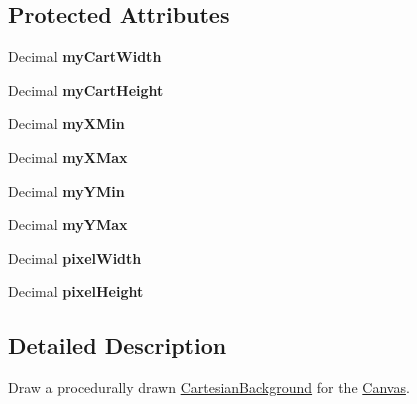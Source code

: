 \subsection*{Protected Attributes}
\begin{DoxyCompactItemize}
\item 
\mbox{\label{classtsgl_1_1_cartesian_background_ab7a5f86531e3ca87a11efb8600fb4e03}} 
Decimal {\bfseries my\+Cart\+Width}
\item 
\mbox{\label{classtsgl_1_1_cartesian_background_ae93d4a1074cb5285406cd753733e48ed}} 
Decimal {\bfseries my\+Cart\+Height}
\item 
\mbox{\label{classtsgl_1_1_cartesian_background_a0d22e13bc40c8d99103170d9386d5de8}} 
Decimal {\bfseries my\+X\+Min}
\item 
\mbox{\label{classtsgl_1_1_cartesian_background_add335e91ed82c520b28369cd93067618}} 
Decimal {\bfseries my\+X\+Max}
\item 
\mbox{\label{classtsgl_1_1_cartesian_background_a16510f597bc529fbc2e96bce3d7bbac5}} 
Decimal {\bfseries my\+Y\+Min}
\item 
\mbox{\label{classtsgl_1_1_cartesian_background_a3afa7fc438538c504347349d9ff8d85c}} 
Decimal {\bfseries my\+Y\+Max}
\item 
\mbox{\label{classtsgl_1_1_cartesian_background_a1c44de7a723be16561717eec0afb7916}} 
Decimal {\bfseries pixel\+Width}
\item 
\mbox{\label{classtsgl_1_1_cartesian_background_a0d1f3d876b9876467691498a28e1fcce}} 
Decimal {\bfseries pixel\+Height}
\end{DoxyCompactItemize}


\subsection{Detailed Description}
Draw a procedurally drawn \hyperlink{classtsgl_1_1_cartesian_background}{Cartesian\+Background} for the \hyperlink{classtsgl_1_1_canvas}{Canvas}. 

